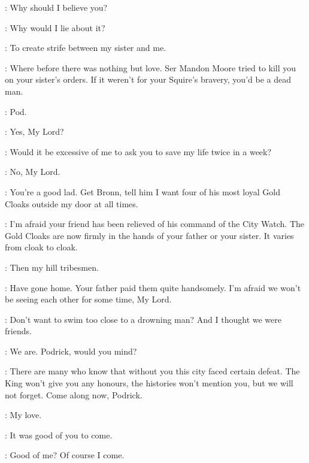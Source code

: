 
\TYRION: Why should I believe you? 

\VARYS: Why would I lie about it? 

\TYRION: To create strife between my sister and me. 

\VARYS: Where before there was nothing but love. Ser Mandon Moore tried to kill you on your sister's orders. If it weren't for your Squire's bravery, you'd be a dead man. 

\TYRION: Pod. 

\PODRICK: Yes, My Lord? 

\TYRION: Would it be excessive of me to ask you to save my life twice in a week? 

\PODRICK: No, My Lord. 

\TYRION: You're a good lad. Get Bronn, tell him I want four of his most loyal Gold Cloaks outside my door at all times. 


\VARYS: I'm afraid your friend has been relieved of his command of the City Watch. The Gold Cloaks are now firmly in the hands of your father or your sister. It varies from cloak to cloak. 

\TYRION: Then my hill tribesmen. 


\VARYS: Have gone home. Your father paid them quite handsomely. I'm afraid we won't be seeing each other for some time, My Lord. 

\TYRION: Don't want to swim too close to a drowning man? And I thought we were friends. 

\VARYS: We are. Podrick, would you mind? 

 
\VARYS:  There are many who know that without you this city faced certain defeat. The King won't give you any honours, the histories won't mention you, but we will not forget. Come along now, Podrick. 


\SHAE: My love. 

\TYRION: It was good of you to come. 

\SHAE: Good of me? Of course I come. 

